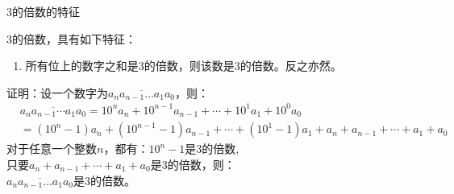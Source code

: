 \documentclass[aspectratio=169]{ctexbeamer} %
\date{\today}
\begin{document}
\begin{frame}[t]{3的倍数的特征}
\begin{spacing}{1.2}
\normalsize
3的倍数，具有如下特征：
\begin{enumerate}[label={\arabic*.}]
\item 所有位上的数字之和是3的倍数，则该数是3的倍数。反之亦然。
\end{enumerate}
证明：设一个数字为$\overline{a_{n}a_{n-1} \dots a_{1}a_{0}}$，则：
\begin{align*}
&\overline{a_{n}a_{n-1} \cdots a_{1}a_{0}} = 10^{n}a_{n} + 10^{n-1}a_{n-1} +\cdots + 10^{1}a_{1} + 10^0a_{0} \\
&=(10^{n}-1)a_{n} + (10^{n-1}-1)a_{n-1}+ \cdots + (10^{1}-1)a_{1} + a_{n} +  a_{n-1} +\cdots + a_{1} + a_{0} 
\end{align*}
对于任意一个整数$n$，都有：$10^{n}-1$是3的倍数, \\
只要$a_{n} +  a_{n-1} +\cdots + a_{1} + a_{0}$是3的倍数，则：\\
$\overline{a_{n}a_{n-1} \dots a_{1}a_{0}}$是3的倍数。
\end{spacing}
\end{frame}
\end{document}
